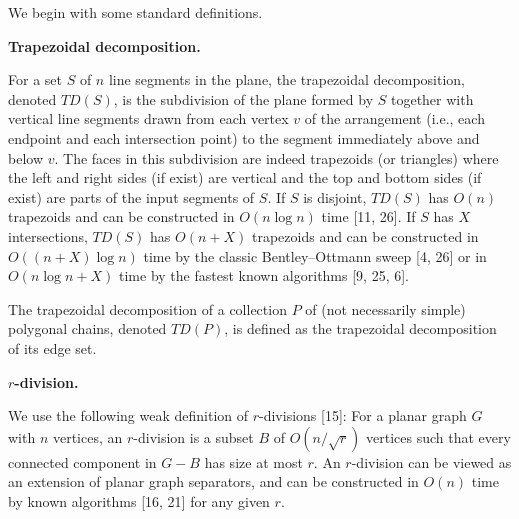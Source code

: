 We begin with some standard definitions.
\par
\par
\par\medskip\noindent\textbf{Trapezoidal decomposition.}\par
For a set $S$ of $n$ line segments in the plane, the trapezoidal decomposition, denoted $\textit{TD}(S)$, is the subdivision of the plane formed by $S$ together with vertical line segments drawn from each vertex $v$ of the arrangement (i.e., each endpoint and each intersection point) to the segment immediately above and below $v$. The faces in this subdivision are indeed trapezoids (or triangles) where the left and right sides (if exist) are vertical and the top and bottom sides (if exist) are parts of the input segments of $S$. If $S$ is disjoint, $\textit{TD}(S)$ has $O(n)$ trapezoids and can be constructed in $O(n\log n)$ time [11, 26]. If $S$ has $X$ intersections, $\textit{TD}(S)$ has $O(n+X)$ trapezoids and can be constructed in $O((n+X)\log n)$ time by the classic Bentley–Ottmann sweep [4, 26] or in $O(n\log n+X)$ time by the fastest known algorithms [9, 25, 6].
\par
\par
The trapezoidal decomposition of a collection $P$ of (not necessarily simple) polygonal chains, denoted $\textit{TD}(P)$, is defined as the trapezoidal decomposition of its edge set.
\par
\par
\par\medskip\noindent\textbf{$r$-division.}\par
We use the following weak definition of $r$-divisions [15]: For a planar graph $G$ with $n$ vertices, an $r$-division is a subset $B$ of $O(n/\sqrt{r})$ vertices such that every connected component in $G-B$ has size at most $r$. An $r$-division can be viewed as an extension of planar graph separators, and can be constructed in $O(n)$ time by known algorithms [16, 21] for any given $r$.
\par
\par
